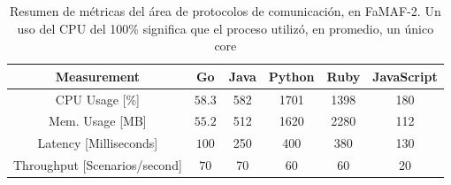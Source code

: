 \documentclass[11pt]{article}
\begin{document}
\begin{table}[H]
\centering
\begin{tabular}{|c|c|c|c|c|c|}
\hline
Measurement       & Go   & Java & Python & Ruby & JavaScript \\ \hline
CPU Usage [\%]         & $58.3$ & 582  & 1701   & 1398 & 180        \\ \hline
Mem. Usage [MB]   & $55.2$ & 512  & 1620   & 2280 & 112        \\ \hline
Latency [Milliseconds]   & $100$  & 250  & 400    & 380  & 130        \\ \hline
Throughput [Scenarios/second] & $70$   & 70   & 60     & 60   & 20         \\ \hline
\end{tabular}
\caption{Resumen de métricas del área de protocolos de comunicación, en FaMAF-2. Un uso del CPU del 100\% significa que el proceso utilizó, en promedio, un único core}
\label{tab:http:famaf_1}
\end{table}
\end{document}
